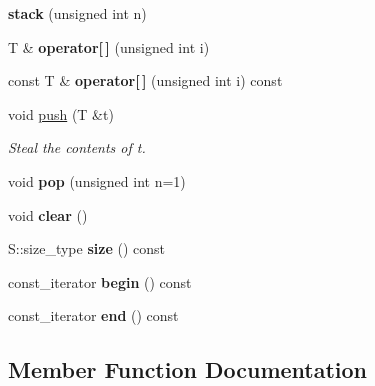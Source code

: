 \begin{DoxyCompactItemize}
\item 
\hypertarget{classyy_1_1stack_af4277ae80177abc36f242c3646cbcfbe}{}{\bfseries stack} (unsigned int n)\label{classyy_1_1stack_af4277ae80177abc36f242c3646cbcfbe}

\item 
\hypertarget{classyy_1_1stack_a1058b8b7e1a3e0aa7b1e6f2f1a62c234}{}T \& {\bfseries operator\mbox{[}$\,$\mbox{]}} (unsigned int i)\label{classyy_1_1stack_a1058b8b7e1a3e0aa7b1e6f2f1a62c234}

\item 
\hypertarget{classyy_1_1stack_a46778e0ee1fd32a559008d5a261df098}{}const T \& {\bfseries operator\mbox{[}$\,$\mbox{]}} (unsigned int i) const \label{classyy_1_1stack_a46778e0ee1fd32a559008d5a261df098}

\item 
void \hyperlink{classyy_1_1stack_acf2b971ffb94c77b56fc0249b55250fa}{push} (T \&t)
\begin{DoxyCompactList}\small\item\em Steal the contents of {\itshape t}. \end{DoxyCompactList}\item 
\hypertarget{classyy_1_1stack_a0800c0a796cade80c3ce9a785dc87564}{}void {\bfseries pop} (unsigned int n=1)\label{classyy_1_1stack_a0800c0a796cade80c3ce9a785dc87564}

\item 
\hypertarget{classyy_1_1stack_ae8b2c8309dcdef98210205b1c96b2238}{}void {\bfseries clear} ()\label{classyy_1_1stack_ae8b2c8309dcdef98210205b1c96b2238}

\item 
\hypertarget{classyy_1_1stack_a16f628feeb98a5244ea914c94c160ac4}{}S\+::size\+\_\+type {\bfseries size} () const \label{classyy_1_1stack_a16f628feeb98a5244ea914c94c160ac4}

\item 
\hypertarget{classyy_1_1stack_a3939df081955a4ad78e14eeb9b2b5dbf}{}const\+\_\+iterator {\bfseries begin} () const \label{classyy_1_1stack_a3939df081955a4ad78e14eeb9b2b5dbf}

\item 
\hypertarget{classyy_1_1stack_a27ade5b933a4dc8a27960c88addda2a0}{}const\+\_\+iterator {\bfseries end} () const \label{classyy_1_1stack_a27ade5b933a4dc8a27960c88addda2a0}

\end{DoxyCompactItemize}


\subsection{Member Function Documentation}
\hypertarget{classyy_1_1stack_acf2b971ffb94c77b56fc0249b55250fa}{}
